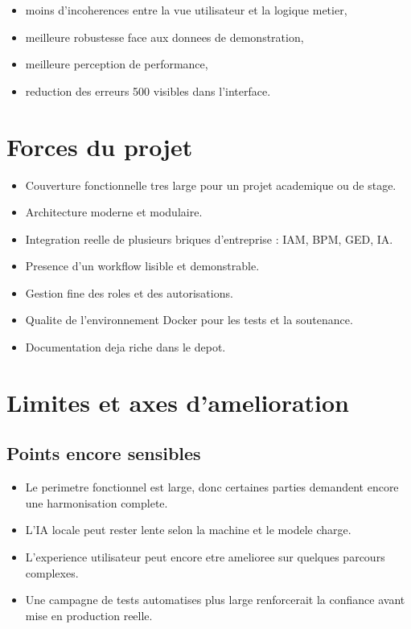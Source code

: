 \documentclass[12pt,a4paper]{article}
\begin{document}
\begin{itemize}[leftmargin=1.2cm]
  \item moins d'incoherences entre la vue utilisateur et la logique metier,
  \item meilleure robustesse face aux donnees de demonstration,
  \item meilleure perception de performance,
  \item reduction des erreurs 500 visibles dans l'interface.
\end{itemize}

\section{Forces du projet}

\begin{itemize}[leftmargin=1.2cm]
  \item Couverture fonctionnelle tres large pour un projet academique ou de stage.
  \item Architecture moderne et modulaire.
  \item Integration reelle de plusieurs briques d'entreprise : IAM, BPM, GED, IA.
  \item Presence d'un workflow lisible et demonstrable.
  \item Gestion fine des roles et des autorisations.
  \item Qualite de l'environnement Docker pour les tests et la soutenance.
  \item Documentation deja riche dans le depot.
\end{itemize}

\section{Limites et axes d'amelioration}

\subsection{Points encore sensibles}

\begin{itemize}[leftmargin=1.2cm]
  \item Le perimetre fonctionnel est large, donc certaines parties demandent encore une harmonisation complete.
  \item L'IA locale peut rester lente selon la machine et le modele charge.
  \item L'experience utilisateur peut encore etre amelioree sur quelques parcours complexes.
  \item Une campagne de tests automatises plus large renforcerait la confiance avant mise en production reelle.
\end{itemize}
\end{document}

